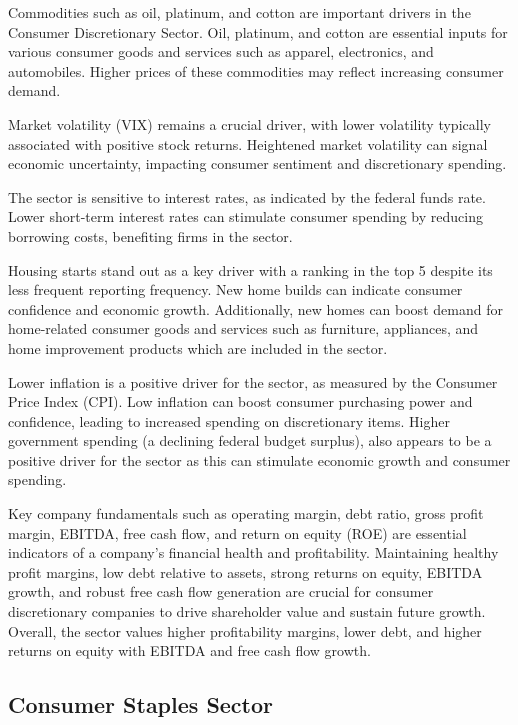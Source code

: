 \documentclass[12pt,a4paper,english]{article}
\begin{document}
Commodities such as oil, platinum, and cotton are important drivers in the Consumer Discretionary Sector. Oil, platinum, and cotton are essential inputs for various consumer goods and services such as apparel, electronics, and automobiles. Higher prices of these commodities may reflect increasing consumer demand.

Market volatility (VIX) remains a crucial driver, with lower volatility typically associated with positive stock returns. Heightened market volatility can signal economic uncertainty, impacting consumer sentiment and discretionary spending.

The sector is sensitive to interest rates, as indicated by the federal funds rate. Lower short-term interest rates can stimulate consumer spending by reducing borrowing costs, benefiting firms in the sector.

Housing starts stand out as a key driver with a ranking in the top 5 despite its less frequent reporting frequency. New home builds can indicate consumer confidence and economic growth. Additionally, new homes can boost demand for home-related consumer goods and services such as furniture, appliances, and home improvement products which are included in the sector.

Lower inflation is a positive driver for the sector, as measured by the Consumer Price Index (CPI). Low inflation can boost consumer purchasing power and confidence, leading to increased spending on discretionary items. Higher government spending (a declining federal budget surplus), also appears to be a positive driver for the sector as this can stimulate economic growth and consumer spending.

Key company fundamentals such as operating margin, debt ratio, gross profit margin, EBITDA, free cash flow, and return on equity (ROE) are essential indicators of a company's financial health and profitability. Maintaining healthy profit margins, low debt relative to assets, strong returns on equity, EBITDA growth, and robust free cash flow generation are crucial for consumer discretionary companies to drive shareholder value and sustain future growth. Overall, the sector values higher profitability margins, lower debt, and higher returns on equity with EBITDA and free cash flow growth.

\subsection{Consumer Staples Sector}
\label{sec:consumer-stap}
\end{document}

